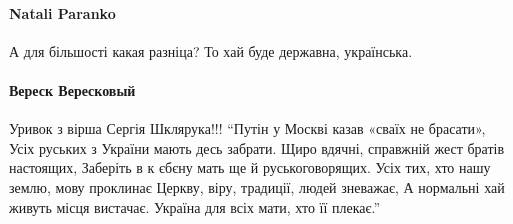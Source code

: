\paragraph{Natali Paranko}
А для більшості какая разніца? То хай буде державна, українська.

\paragraph{Вереск Вересковый}


Уривок з вірша Сергія Шклярука!!! \enquote{Путін у Москві казав «сваїх не брасати»,
Усіх руських з України мають десь забрати.
Щиро вдячні, справжній жест братів настоящих,
Заберіть в к єбєну мать ще й руськоговорящих.
Усіх тих, хто нашу землю, мову проклинає
Церкву, віру, традиції, людей зневажає,
А нормальні хай живуть місця вистачає.
Україна для всіх мати, хто її плекає.} 
